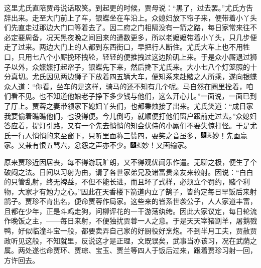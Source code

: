 这里尤氏直陪贾母说话取笑。到起更的时候，贾母说：“黑了，过去罢。”尤氏方告辞出来。走至大门前上了车，银蝶坐在车沿上。众媳妇放下帘子来，便带着小丫头们先直走过那边大门口等着去了。因二府之门相隔没有一箭之路，每日家常来往不必定要周备，况天黑夜晚之间回来的遭数更多，所以老嬷嬷带着小丫头，只几步便走了过来。两边大门上的人都到东西街口，早把行人断住。尤氏大车上也不用牲口，只用七八个小厮挽环拽轮，轻轻的便推拽过这边阶矶上来。于是众小厮退过狮子以外，众嬷嬷打起帘子，银蝶先下来，然后搀下尤氏来。大小七八个灯笼照的十分真切。尤氏因见两边狮子下放着四五辆大车，便知系来赴赌之人所乘，遂向银蝶众人道：“你看，坐车的是这样，骑马的还不知有几个呢。马自然在圈里拴着，咱们看不见。也不知道他娘老子挣下多少钱与他们，这么开心儿。”一面说，一面已到了厅上。贾蓉之妻带领家下媳妇丫头们，也都秉烛接了出来。尤氏笑道：“成日家我要偷着瞧瞧他们，也没得便。今儿倒巧，就顺便打他们窗户跟前走过去。”众媳妇答应着，提灯引路，又有一个先去悄悄的知会伏侍的小厮们不要失惊打怪。于是尤氏一行人悄悄的来至窗下，只听里面称三赞四，耍笑之音虽多，{\includegraphics[width=3mm]{../Images/00004}\includegraphics[width=3mm]{../Images/00012}\footnotesize \kaishu 妙！先画赢家。}又兼有恨五骂六，忿怨之声亦不少。{\includegraphics[width=3mm]{../Images/00004}\includegraphics[width=3mm]{../Images/00012}\footnotesize \kaishu 妙！又画输家。}

原来贾珍近因居丧，每不得游玩旷朗，又不得观优闻乐作遣。无聊之极，便生了个破闷之法。日间以习射为由，请了各世家弟兄及诸富贵亲友来较射。因说：“白白的只管乱射，终无裨益，不但不能长进，而且坏了式样，必须立个罚约，赌个利物，大家才有勉力之心。”因此在天香楼下箭道内立了鹄子，皆约定每日早饭后来射鹄子。贾珍不肯出名，便命贾蓉作局家。这些来的皆系世袭公子，人人家道丰富，且都在少年，正是斗鸡走狗，问柳评花的一干游荡纨绔。因此大家议定，每日轮流作晚饭之主，------每日来射，不便独扰贾蓉一人之意。于是天天宰猪割羊，屠鹅戮鸭，好似临潼斗宝一般，都要卖弄自己家的好厨役好烹炮。不到半月工夫，贾赦贾政听见这般，不知就里，反说这才是正理，文既误矣，武事当亦该习，况在武荫之属。两处遂也命贾环、贾琮、宝玉、贾兰等四人于饭后过来，跟着贾珍习射一回，方许回去。


